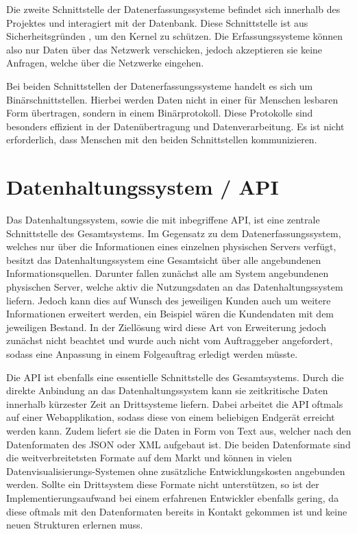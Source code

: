 Die zweite Schnittstelle der Datenerfassungssysteme befindet sich innerhalb des
Projektes und interagiert mit der Datenbank. Diese Schnittstelle ist aus
Sicherheitsgründen , um den Kernel zu
schützen. Die Erfassungssysteme können also nur Daten über das Netzwerk
verschicken, jedoch akzeptieren sie keine Anfragen, welche über die Netzwerke
eingehen.

Bei beiden Schnittstellen der Datenerfassungssysteme handelt es sich um
Binärschnittstellen. Hierbei werden Daten nicht in einer für Menschen lesbaren
Form übertragen, sondern in einem Binärprotokoll. Diese Protokolle sind
besonders effizient in der Datenübertragung und Datenverarbeitung. Es ist nicht
erforderlich, dass Menschen mit den beiden Schnittstellen kommunizieren.
\tm%

\section{Datenhaltungssystem / API}
Das Datenhaltungssystem, sowie die mit inbegriffene \gls{API}, ist eine
zentrale Schnittstelle des Gesamtsystems. Im Gegensatz zu dem
Datenerfassungssystem, welches nur über die Informationen eines einzelnen
physischen Servers verfügt, besitzt das Datenhaltungssystem eine Gesamtsicht
über alle angebundenen Informationsquellen. Darunter fallen zunächst alle am
System angebundenen physischen Server, welche aktiv die Nutzungsdaten an das
Datenhaltungssystem liefern. Jedoch kann dies auf Wunsch des jeweiligen Kunden
auch um weitere Informationen erweitert werden, ein Beispiel wären die
Kundendaten mit dem jeweiligen Bestand. In der Ziellösung wird diese Art von
Erweiterung jedoch zunächst nicht beachtet und wurde auch nicht vom
Auftraggeber angefordert, sodass eine Anpassung in einem Folgeauftrag erledigt
werden müsste.

Die \gls{API} ist ebenfalls eine essentielle Schnittstelle des Gesamtsystems.
Durch die direkte Anbindung an das Datenhaltungssystem kann sie zeitkritische
Daten innerhalb kürzester Zeit an Drittsysteme liefern. Dabei arbeitet die
\gls{API} oftmals auf einer Webapplikation, sodass diese von einem beliebigen
Endgerät erreicht werden kann. Zudem liefert sie die Daten in Form von Text
aus, welcher nach den Datenformaten des \gls{JSON} oder \gls{XML} aufgebaut
ist. Die beiden Datenformate sind die weitverbreitetsten Formate auf dem Markt
und können in vielen Datenvisualisierungs\hyp{}Systemen ohne zusätzliche
Entwicklungskosten angebunden werden. Sollte ein Drittsystem diese Formate
nicht unterstützen, so ist der Implementierungsaufwand bei einem erfahrenen
Entwickler ebenfalls gering, da diese oftmals mit den Datenformaten bereits in
Kontakt gekommen ist und keine neuen Strukturen erlernen muss.
\nl%

